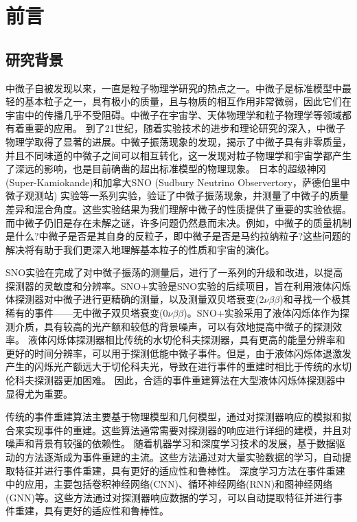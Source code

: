 \chapter{前言}

\section{研究背景}

中微子自被发现以来，一直是粒子物理学研究的热点之一。中微子是标准模型中最轻的基本粒子之一，具有极小的质量，且与物质的相互作用非常微弱，因此它们在宇宙中的传播几乎不受阻碍。中微子在宇宙学、天体物理学和粒子物理学等领域都有着重要的应用。
到了21世纪，随着实验技术的进步和理论研究的深入，中微子物理学取得了显著的进展。中微子振荡现象的发现，揭示了中微子具有非零质量，并且不同味道的中微子之间可以相互转化，这一发现对粒子物理学和宇宙学都产生了深远的影响，也是目前确凿的超出标准模型的物理现象。
日本的超级神冈(Super-Kamiokande)和加拿大SNO (Sudbury Neutrino Observertory，萨德伯里中微子观测站) 实验等一系列实验，验证了中微子振荡现象\cite{PhysRevLett.87.071301}\cite{PhysRevLett.81.1562}，并测量了中微子的质量差异和混合角度。这些实验结果为我们理解中微子的性质提供了重要的实验依据。
而中微子仍旧是存在未解之谜，许多问题仍然悬而未决。例如，中微子的质量机制是什么?中微子是否是其自身的反粒子，即中微子是否是马约拉纳粒子?这些问题的解决将有助于我们更深入地理解基本粒子的性质和宇宙的演化。

SNO实验在完成了对中微子振荡的测量后，进行了一系列的升级和改进，以提高探测器的灵敏度和分辨率。SNO+实验\cite{andringa2016current}\cite{albanese2021sno+}是SNO实验的后续项目，旨在利用液体闪烁体探测器对中微子进行更精确的测量，以及测量双贝塔衰变(2$\nu\beta\beta$)和寻找一个极其稀有的事件——无中微子双贝塔衰变(0$\nu\beta\beta$)\cite{albanese2021sno+}。SNO+实验采用了液体闪烁体作为探测介质，具有较高的光产额和较低的背景噪声，可以有效地提高中微子的探测效率。
液体闪烁体探测器相比传统的水切伦科夫探测器，具有更高的能量分辨率和更好的时间分辨率，可以用于探测低能中微子事件。但是，由于液体闪烁体退激发产生的闪烁光产额远大于切伦科夫光，导致在进行事件的重建时相比于传统的水切伦科夫探测器更加困难。
因此，合适的事件重建算法在大型液体闪烁体探测器中显得尤为重要。

传统的事件重建算法主要基于物理模型和几何模型，通过对探测器响应的模拟和拟合来实现事件的重建。这些算法通常需要对探测器的响应进行详细的建模，并且对噪声和背景有较强的依赖性。
随着机器学习和深度学习技术的发展，基于数据驱动的方法逐渐成为事件重建的主流。这些方法通过对大量实验数据的学习，自动提取特征并进行事件重建，具有更好的适应性和鲁棒性。
深度学习方法在事件重建中的应用，主要包括卷积神经网络(CNN)、循环神经网络(RNN)和图神经网络(GNN)等。这些方法通过对探测器响应数据的学习，可以自动提取特征并进行事件重建，具有更好的适应性和鲁棒性。

